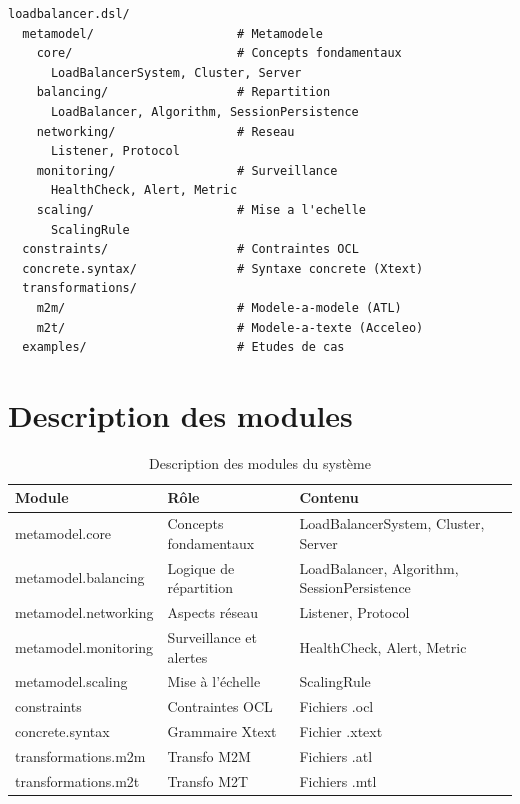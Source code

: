 \documentclass[12pt,a4paper]{report}
\begin{document}
\begin{lstlisting}[language={},caption={Structure en packages du projet}]
loadbalancer.dsl/
  metamodel/                    # Metamodele
    core/                       # Concepts fondamentaux
      LoadBalancerSystem, Cluster, Server
    balancing/                  # Repartition
      LoadBalancer, Algorithm, SessionPersistence
    networking/                 # Reseau
      Listener, Protocol
    monitoring/                 # Surveillance
      HealthCheck, Alert, Metric
    scaling/                    # Mise a l'echelle
      ScalingRule
  constraints/                  # Contraintes OCL
  concrete.syntax/              # Syntaxe concrete (Xtext)
  transformations/
    m2m/                        # Modele-a-modele (ATL)
    m2t/                        # Modele-a-texte (Acceleo)
  examples/                     # Etudes de cas
\end{lstlisting}

\section{Description des modules}

\begin{table}[H]
\centering
\caption{Description des modules du système}
\begin{tabular}{|p{3.5cm}|p{5cm}|p{5cm}|}
\hline
\textbf{Module} & \textbf{Rôle} & \textbf{Contenu} \\
\hline
metamodel.core & Concepts fondamentaux & LoadBalancerSystem, Cluster, Server \\
\hline
metamodel.balancing & Logique de répartition & LoadBalancer, Algorithm, SessionPersistence \\
\hline
metamodel.networking & Aspects réseau & Listener, Protocol \\
\hline
metamodel.monitoring & Surveillance et alertes & HealthCheck, Alert, Metric \\
\hline
metamodel.scaling & Mise à l'échelle & ScalingRule \\
\hline
constraints & Contraintes OCL & Fichiers .ocl \\
\hline
concrete.syntax & Grammaire Xtext & Fichier .xtext \\
\hline
transformations.m2m & Transfo M2M & Fichiers .atl \\
\hline
transformations.m2t & Transfo M2T & Fichiers .mtl \\
\hline
\end{tabular}
\end{table}
\end{document}
